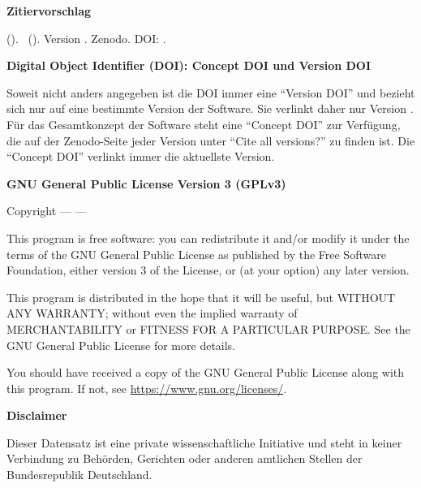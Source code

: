 \vspace{0.5cm}

\textbf{Zitiervorschlag}

\emph{\projectauthor} (\the\year ). \softwaretitle\ (\softwareshort ). Version \version . Zenodo. DOI: \softwareversiondoi .


\vspace{0.5cm}

\textbf{Digital Object Identifier (DOI): Concept DOI und Version DOI}

Soweit nicht anders angegeben ist die DOI immer eine \enquote{Version DOI} und bezieht sich nur auf eine bestimmte Version der Software. Sie verlinkt daher nur Version \version . Für das Gesamtkonzept der Software steht eine \enquote{Concept DOI} zur Verfügung, die auf der Zenodo-Seite jeder Version unter \enquote{Cite all versions?} zu finden ist. Die \enquote{Concept DOI} verlinkt immer die aktuellste Version.

\vspace{0.5cm}


\textbf{GNU General Public License Version 3 (GPLv3)}

Copyright --- \the\year --- \projectauthor

This program is free software: you can redistribute it and/or modify it under the terms of the GNU General Public License as published by the Free Software Foundation, either version 3 of the License, or (at your option) any later version.

This program is distributed in the hope that it will be useful, but WITHOUT ANY WARRANTY; without even the implied warranty of MERCHANTABILITY or FITNESS FOR A PARTICULAR PURPOSE.  See the GNU General Public License for more details.

You should have received a copy of the GNU General Public License along with this program.  If not, see \url{https://www.gnu.org/licenses/}.


\vspace{0.5cm}

\textbf{Disclaimer} 

Dieser Datensatz ist eine private wissenschaftliche Initiative und steht in keiner Verbindung zu Behörden, Gerichten oder anderen amtlichen Stellen der Bundesrepublik Deutschland.

\newpage
